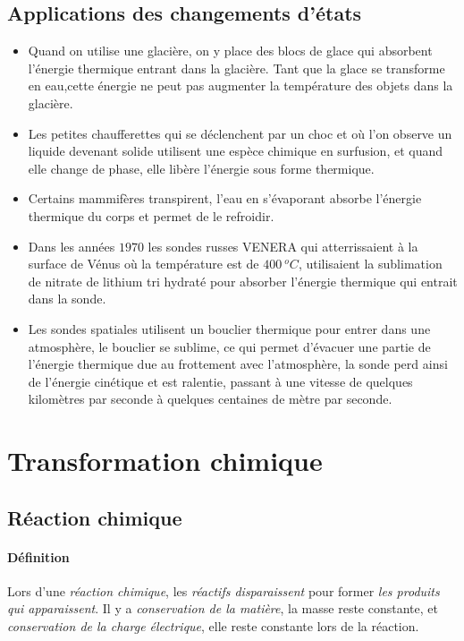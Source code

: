 \subsection{Applications des changements d'états}
\begin{itemize}
 \item Quand on utilise une glacière, on y place des blocs de glace qui absorbent l'énergie thermique entrant dans la glacière. Tant que la glace se transforme en eau,cette énergie ne peut pas augmenter la température des objets dans la glacière.
 \item Les petites chaufferettes qui se déclenchent par un choc et où l'on observe un liquide devenant solide utilisent une espèce chimique en surfusion, et quand elle change de phase, elle libère l'énergie sous forme thermique. 
 \item Certains mammifères transpirent, l'eau en s'évaporant absorbe l'énergie thermique du corps et permet de le refroidir. 
 \item Dans les années $1970$ les sondes russes VENERA qui atterrissaient à la surface de Vénus où la température est de $400~{}^oC$, utilisaient la sublimation de nitrate de lithium tri hydraté pour absorber l'énergie thermique qui entrait dans la sonde.
 \item Les sondes spatiales utilisent un bouclier thermique pour entrer dans une atmosphère, le bouclier se sublime, ce qui permet d'évacuer une partie de l'énergie thermique due au frottement avec l'atmosphère, la sonde perd ainsi de l'énergie cinétique et est ralentie, passant à une vitesse de quelques kilomètres par seconde à quelques centaines de mètre par seconde. 
\end{itemize}

\section{Transformation chimique}
\subsection{Réaction chimique}
\paragraph{Définition} Lors d'une \textit{réaction chimique}, les \textit{réactifs disparaissent} pour former \textit{les produits qui apparaissent}. Il
y a \textit{conservation de la matière}, la masse reste constante, et \textit{conservation de la charge électrique}, elle reste constante lors de la réaction.

